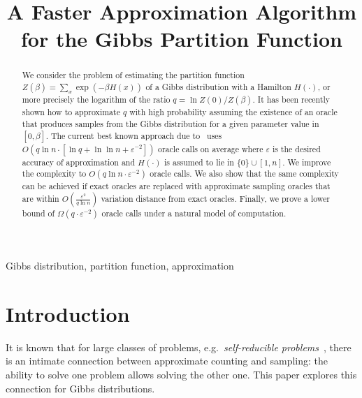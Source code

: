 \documentclass[final,12pt]{colt2018}
\title[A Faster Approximation Algorithm for the Gibbs Partition Function]{A Faster Approximation Algorithm for the Gibbs Partition Function}
\begin{document}
\maketitle

\begin{abstract}
We consider the problem of estimating the partition function $Z(\beta)=\sum_x \exp(-\beta H(x))$
of a Gibbs distribution with a Hamilton $H(\cdot)$, or more precisely the logarithm of the ratio $q=\ln Z(0)/Z(\beta)$.
It has been recently shown how to approximate $q$ with high probability assuming
the existence of an oracle that produces samples from the Gibbs distribution for a given parameter value in $[0,\beta]$.
The current best known approach due to~\cite{Huber:Gibbs} uses $O(q\ln n\cdot[\ln q + \ln \ln n+\varepsilon^{-2}])$ 
oracle calls on average where $\varepsilon$ is the desired accuracy of approximation and $H(\cdot)$ is assumed to lie in $\{0\}\cup[1,n]$.
We improve the complexity to $O(q\ln n\cdot\varepsilon^{-2})$ oracle calls.
We also show that the same complexity can be achieved if exact oracles are replaced with approximate sampling oracles
that are within $O(\frac{\varepsilon^2}{q\ln n})$
variation distance from exact oracles.
Finally, we prove a lower bound of $\Omega(q\cdot \varepsilon^{-2})$ oracle calls under a natural model of computation.
\end{abstract}

\begin{keywords}
Gibbs distribution, partition function, approximation
\end{keywords}

\section{Introduction}
It is known that for large classes of problems, e.g.\ {\em self-reducible problems}~\citep{Jerrum:86},
there is an intimate connection between approximate counting and sampling: the ability to solve
one problem allows solving the other one. This paper explores this connection for Gibbs distributions.
\end{document}
